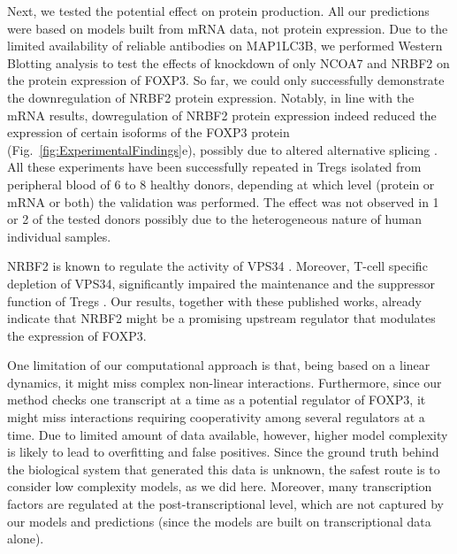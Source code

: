 \documentclass[oneside, 10pt, a4paper, twocolumn]{article}
\begin{document}
Next, we tested the potential effect on protein production. All our predictions were based on models built from mRNA data, not protein expression. Due to the limited availability of reliable antibodies on MAP1LC3B, we performed Western Blotting analysis to test the effects of knockdown of only NCOA7 and NRBF2 on the protein expression of FOXP3. So far, we could only successfully demonstrate the downregulation of NRBF2 protein expression. Notably, in line with the mRNA results, dowregulation of NRBF2 protein expression indeed reduced the expression of certain isoforms of the FOXP3 protein (Fig.~\ref{fig:ExperimentalFindings}e), possibly due to altered alternative splicing  \citep{Allan2005}. All these experiments have been successfully repeated in Tregs isolated from peripheral blood of 6 to 8 healthy donors, depending at which level (protein or mRNA or both) the validation was performed. The effect was not observed in 1 or 2 of the tested donors possibly due to the heterogeneous nature of human individual samples.

NRBF2 is known to regulate the activity of VPS34 \citep{Lu2014}. Moreover, T-cell specific depletion of VPS34, significantly impaired the maintenance and the suppressor function of Tregs \citep{Parekh2013}. Our results, together with these published works, already indicate that NRBF2 might be a promising upstream regulator that modulates the expression of FOXP3.

One limitation of our computational approach is that, being based on a linear dynamics, it might miss complex non-linear interactions. Furthermore, since our method checks one transcript at a time as a potential regulator of FOXP3, it might miss interactions requiring cooperativity among several regulators at a time. Due to limited amount of data available, however, higher model complexity is likely to lead to overfitting and false positives. Since the ground truth behind the biological system that generated this data is unknown, the safest route is to consider low complexity models, as we did here. 
Moreover, many transcription factors are regulated at the post-transcriptional level, which are not captured by our models and predictions (since the models are built on transcriptional data alone). 
\end{document}
